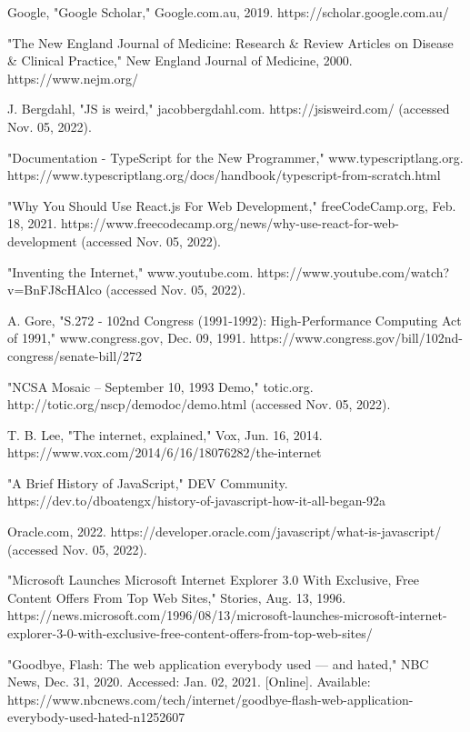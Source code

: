 \begin{thebibliography}{9}
Google, "Google Scholar," Google.com.au, 2019. https://scholar.google.com.au/

"The New England Journal of Medicine: Research \& Review Articles on Disease \& Clinical Practice," New England Journal of Medicine, 2000. https://www.nejm.org/

J. Bergdahl, "JS is weird," jacobbergdahl.com. https://jsisweird.com/ (accessed Nov. 05, 2022).

"Documentation - TypeScript for the New Programmer," www.typescriptlang.org. https://www.typescriptlang.org/docs/handbook/typescript-from-scratch.html

"Why You Should Use React.js For Web Development," freeCodeCamp.org, Feb. 18, 2021. https://www.freecodecamp.org/news/why-use-react-for-web-development (accessed Nov. 05, 2022).

"Inventing the Internet," www.youtube.com. https://www.youtube.com/watch?v=BnFJ8cHAlco (accessed Nov. 05, 2022).

A. Gore, "S.272 - 102nd Congress (1991-1992): High-Performance Computing Act of 1991," www.congress.gov, Dec. 09, 1991. https://www.congress.gov/bill/102nd-congress/senate-bill/272

"NCSA Mosaic -- September 10, 1993 Demo," totic.org. http://totic.org/nscp/demodoc/demo.html (accessed Nov. 05, 2022).

T. B. Lee, "The internet, explained," Vox, Jun. 16, 2014. https://www.vox.com/2014/6/16/18076282/the-internet

"A Brief History of JavaScript," DEV Community. https://dev.to/dboatengx/history-of-javascript-how-it-all-began-92a

Oracle.com, 2022. https://developer.oracle.com/javascript/what-is-javascript/ (accessed Nov. 05, 2022).

"Microsoft Launches Microsoft Internet Explorer 3.0 With Exclusive, Free Content Offers From Top Web Sites," Stories, Aug. 13, 1996. https://news.microsoft.com/1996/08/13/microsoft-launches-microsoft-internet-explorer-3-0-with-exclusive-free-content-offers-from-top-web-sites/

"Goodbye, Flash: The web application everybody used — and hated," NBC News, Dec. 31, 2020. Accessed: Jan. 02, 2021. [Online]. Available: https://www.nbcnews.com/tech/internet/goodbye-flash-web-application-everybody-used-hated-n1252607


\end{thebibliography}
